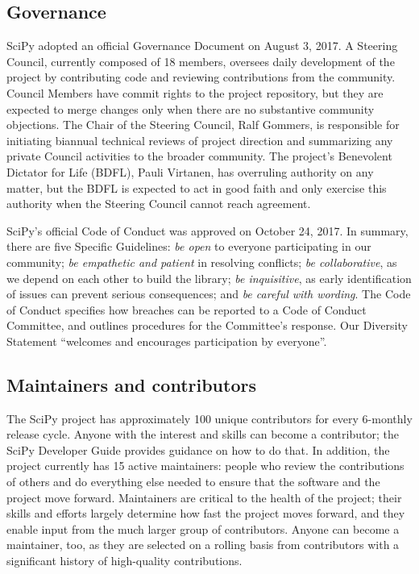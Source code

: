 \documentclass[fleqn,10pt]{wlscirep}
\begin{document}
\subsection*{Governance}

SciPy adopted an official Governance Document on August 3, 2017\cite{SciPyProjectGovernance}. A Steering Council, currently composed of 18 members, oversees daily development of the project by contributing code and reviewing contributions from the community. Council Members have commit rights to the project repository, but they are expected to merge changes only when there are no substantive community objections. The Chair of the Steering Council, Ralf Gommers, is responsible for initiating biannual technical reviews of project direction and summarizing any private Council activities to the broader community. The project's Benevolent Dictator for Life (BDFL), Pauli Virtanen, has overruling authority on any matter, but the BDFL is expected to act in good faith and only exercise this authority when the Steering Council cannot reach agreement.

SciPy's official Code of Conduct was approved on October 24, 2017. In summary, there are five Specific Guidelines:
\emph{be open} to everyone participating in our community;
\emph{be empathetic and patient} in resolving conflicts;
\emph{be collaborative}, as we depend on each other to build the library;
\emph{be inquisitive}, as early identification of issues can prevent serious consequences; and
\emph{be careful with wording}.
The Code of Conduct specifies how breaches can be reported to a Code of Conduct Committee, and outlines procedures for the Committee's response. Our Diversity Statement ``welcomes and encourages participation by everyone''.

\subsection*{Maintainers and contributors}

The SciPy project has approximately 100 unique contributors
for every 6-monthly release cycle. Anyone with the interest and
skills can become a contributor; the SciPy Developer
Guide\cite{scipy-dev-guide} provides guidance on how to do that.
In addition, the project currently has 15 active maintainers: people who review
the contributions of others and do everything else needed to ensure that the
software and the project move forward. Maintainers are critical to the health
of the project\cite{eghbal2016}; their skills and efforts largely determine how
fast the project moves forward, and they enable input from the much
larger group of contributors. Anyone can become a maintainer, too, as they
are selected on a rolling basis from contributors with a significant history of
high-quality contributions.
\end{document}
